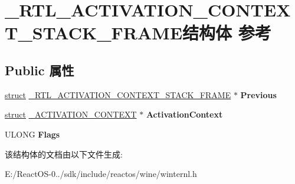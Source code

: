 \hypertarget{struct___r_t_l___a_c_t_i_v_a_t_i_o_n___c_o_n_t_e_x_t___s_t_a_c_k___f_r_a_m_e}{}\section{\+\_\+\+R\+T\+L\+\_\+\+A\+C\+T\+I\+V\+A\+T\+I\+O\+N\+\_\+\+C\+O\+N\+T\+E\+X\+T\+\_\+\+S\+T\+A\+C\+K\+\_\+\+F\+R\+A\+M\+E结构体 参考}
\label{struct___r_t_l___a_c_t_i_v_a_t_i_o_n___c_o_n_t_e_x_t___s_t_a_c_k___f_r_a_m_e}
\subsection*{Public 属性}
\begin{DoxyCompactItemize}
\item 
\mbox{\label{struct___r_t_l___a_c_t_i_v_a_t_i_o_n___c_o_n_t_e_x_t___s_t_a_c_k___f_r_a_m_e_a7db6dedc7e6cdc8d8e490c2f92c42add}} 
\hyperlink{interfacestruct}{struct} \hyperlink{struct___r_t_l___a_c_t_i_v_a_t_i_o_n___c_o_n_t_e_x_t___s_t_a_c_k___f_r_a_m_e}{\+\_\+\+R\+T\+L\+\_\+\+A\+C\+T\+I\+V\+A\+T\+I\+O\+N\+\_\+\+C\+O\+N\+T\+E\+X\+T\+\_\+\+S\+T\+A\+C\+K\+\_\+\+F\+R\+A\+ME} $\ast$ {\bfseries Previous}
\item 
\mbox{\label{struct___r_t_l___a_c_t_i_v_a_t_i_o_n___c_o_n_t_e_x_t___s_t_a_c_k___f_r_a_m_e_a094557a87373c82220c5e7526a5db57c}} 
\hyperlink{interfacestruct}{struct} \hyperlink{struct___a_c_t_i_v_a_t_i_o_n___c_o_n_t_e_x_t}{\+\_\+\+A\+C\+T\+I\+V\+A\+T\+I\+O\+N\+\_\+\+C\+O\+N\+T\+E\+XT} $\ast$ {\bfseries Activation\+Context}
\item 
\mbox{\label{struct___r_t_l___a_c_t_i_v_a_t_i_o_n___c_o_n_t_e_x_t___s_t_a_c_k___f_r_a_m_e_aa01d57714601bcccb31fdb21c6d5c913}} 
U\+L\+O\+NG {\bfseries Flags}
\end{DoxyCompactItemize}


该结构体的文档由以下文件生成\+:\begin{DoxyCompactItemize}
\item 
E\+:/\+React\+O\+S-\/0../sdk/include/reactos/wine/winternl.\+h\end{DoxyCompactItemize}
